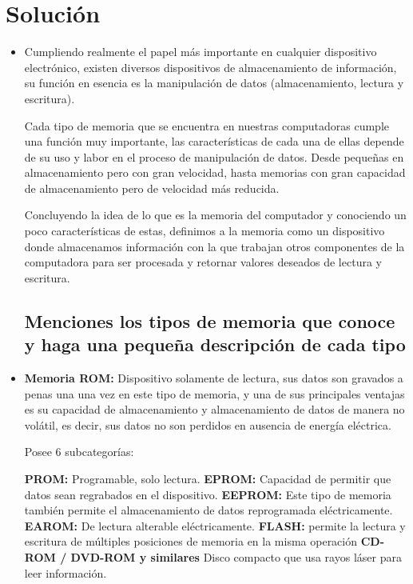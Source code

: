 \section{Solución}
\begin{itemize}

    \subsection{Defina que es la memoria del computador}
    \item Cumpliendo realmente el papel más importante en cualquier dispositivo electrónico, existen diversos dispositivos de almacenamiento de información, su función en esencia es la manipulación de datos (almacenamiento, lectura y escritura).
    
    Cada tipo de memoria que se encuentra en nuestras computadoras cumple una función muy importante, las características de cada una de ellas depende de su uso y labor en el proceso de manipulación de datos. Desde pequeñas en almacenamiento pero con gran velocidad, hasta memorias con gran capacidad de almacenamiento pero de velocidad más reducida.
    
    Concluyendo la idea de lo que es la memoria del computador y conociendo un poco características de estas, definimos a la memoria como un dispositivo donde almacenamos información con la que trabajan otros componentes de la computadora para ser procesada y retornar valores deseados de lectura y escritura.
    
    
    
    \subsection{ Menciones los tipos de memoria que conoce y haga una pequeña descripción de cada tipo}
    \item \textbf{Memoria ROM: } Dispositivo solamente de lectura, sus datos son gravados a penas una una vez en este tipo de memoria, y una de sus principales ventajas es su capacidad de almacenamiento y almacenamiento de datos de manera no volátil, es decir, sus datos no son perdidos en ausencia de energía eléctrica.
    
    Posee 6 subcategorías:
    
    \textbf{PROM:} Programable, solo lectura. \newline
    \textbf{EPROM:} Capacidad de permitir que datos sean regrabados en el dispositivo. \newline
    \textbf{EEPROM:} Este tipo de memoria también permite el almacenamiento de datos reprogramada eléctricamente. \newline
    \textbf{EAROM:} De lectura alterable eléctricamente. \newline
    \textbf{FLASH:} permite la lectura y escritura de múltiples posiciones de memoria en la misma operación \newline
    \textbf{CD-ROM / DVD-ROM y similares} Disco compacto que usa rayos láser para leer información. \newline
    

\end{itemize}

